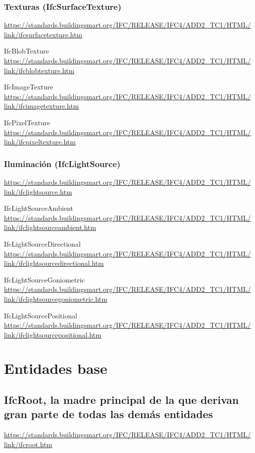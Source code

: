 \documentclass[spanish,12pt,a4paper,final,oneside]{book}
\begin{document}
\subsection{Texturas (IfcSurfaceTexture)}
\url{https://standards.buildingsmart.org/IFC/RELEASE/IFC4/ADD2_TC1/HTML/link/ifcsurfacetexture.htm}

IfcBlobTexture
\\ \url{https://standards.buildingsmart.org/IFC/RELEASE/IFC4/ADD2_TC1/HTML/link/ifcblobtexture.htm}

IfcImageTexture
\\ \url{https://standards.buildingsmart.org/IFC/RELEASE/IFC4/ADD2_TC1/HTML/link/ifcimagetexture.htm}

IfcPixelTexture
\\ \url{https://standards.buildingsmart.org/IFC/RELEASE/IFC4/ADD2_TC1/HTML/link/ifcpixeltexture.htm}


\subsection{Iluminación (IfcLightSource)}
\url{https://standards.buildingsmart.org/IFC/RELEASE/IFC4/ADD2_TC1/HTML/link/ifclightsource.htm}

IfcLightSourceAmbient
\\ \url{https://standards.buildingsmart.org/IFC/RELEASE/IFC4/ADD2_TC1/HTML/link/ifclightsourceambient.htm}

IfcLightSourceDirectional
\\ \url{https://standards.buildingsmart.org/IFC/RELEASE/IFC4/ADD2_TC1/HTML/link/ifclightsourcedirectional.htm}

IfcLightSourceGoniometric
\\ \url{https://standards.buildingsmart.org/IFC/RELEASE/IFC4/ADD2_TC1/HTML/link/ifclightsourcegoniometric.htm}

IfcLightSourcePositional
\\ \url{https://standards.buildingsmart.org/IFC/RELEASE/IFC4/ADD2_TC1/HTML/link/ifclightsourcepositional.htm}



\chapter{Entidades base}

\section{IfcRoot, la madre principal de la que derivan gran parte de todas las demás entidades}
\url{https://standards.buildingsmart.org/IFC/RELEASE/IFC4/ADD2_TC1/HTML/link/ifcroot.htm}
\end{document}
